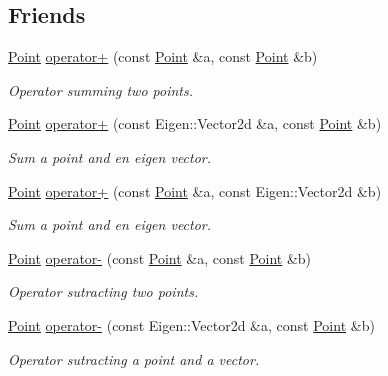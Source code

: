 \subsection*{Friends}
\begin{DoxyCompactItemize}
\item 
\hyperlink{classTspeed_1_1Geo_1_1Point}{Point} \hyperlink{classTspeed_1_1Geo_1_1Point_a96f6a3fd676e84673695954a9c38f9fc}{operator+} (const \hyperlink{classTspeed_1_1Geo_1_1Point}{Point} \&a, const \hyperlink{classTspeed_1_1Geo_1_1Point}{Point} \&b)
\begin{DoxyCompactList}\small\item\em Operator summing two points. \end{DoxyCompactList}\item 
\hyperlink{classTspeed_1_1Geo_1_1Point}{Point} \hyperlink{classTspeed_1_1Geo_1_1Point_af8a6ecf275f1df192e8f85a1ec6ea578}{operator+} (const Eigen\-::\-Vector2d \&a, const \hyperlink{classTspeed_1_1Geo_1_1Point}{Point} \&b)
\begin{DoxyCompactList}\small\item\em Sum a point and en eigen vector. \end{DoxyCompactList}\item 
\hyperlink{classTspeed_1_1Geo_1_1Point}{Point} \hyperlink{classTspeed_1_1Geo_1_1Point_a055f4bc786ea18b7409273eb968ef615}{operator+} (const \hyperlink{classTspeed_1_1Geo_1_1Point}{Point} \&a, const Eigen\-::\-Vector2d \&b)
\begin{DoxyCompactList}\small\item\em Sum a point and en eigen vector. \end{DoxyCompactList}\item 
\hyperlink{classTspeed_1_1Geo_1_1Point}{Point} \hyperlink{classTspeed_1_1Geo_1_1Point_a7cdfe306ee6075d5444000f6a4e85301}{operator-\/} (const \hyperlink{classTspeed_1_1Geo_1_1Point}{Point} \&a, const \hyperlink{classTspeed_1_1Geo_1_1Point}{Point} \&b)
\begin{DoxyCompactList}\small\item\em Operator sutracting two points. \end{DoxyCompactList}\item 
\hyperlink{classTspeed_1_1Geo_1_1Point}{Point} \hyperlink{classTspeed_1_1Geo_1_1Point_a1612c0e7347b698b81dd09392719afef}{operator-\/} (const Eigen\-::\-Vector2d \&a, const \hyperlink{classTspeed_1_1Geo_1_1Point}{Point} \&b)
\begin{DoxyCompactList}\small\item\em Operator sutracting a point and a vector. \end{DoxyCompactList}\item 

\end{DoxyCompactItemize}
